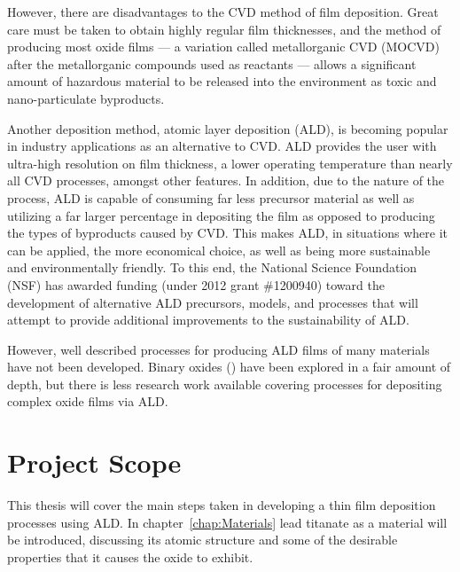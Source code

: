 However, there are disadvantages to the CVD method of film deposition. Great care must be taken to obtain highly regular film thicknesses, and the method of producing most oxide films --- a variation called metallorganic CVD (MOCVD) after the metallorganic compounds used as reactants --- allows a significant amount of hazardous material to be released into the environment as toxic and nano-particulate byproducts. 

Another deposition method, atomic layer deposition (ALD), is becoming popular in industry applications as an alternative to CVD. ALD provides the user with ultra-high resolution on film thickness, a lower operating temperature than nearly all CVD processes, amongst other features. In addition, due to the nature of the process, ALD is capable of consuming far less precursor material as well as utilizing a far larger percentage in depositing the film as opposed to producing the types of byproducts caused by CVD.\cite{ALD-Handbook} This makes ALD, in situations where it can be applied, the more economical choice, as well as being more sustainable and environmentally friendly. To this end, the National Science Foundation (NSF) has awarded funding (under 2012 grant \#1200940) toward the development of alternative ALD precursors, models, and processes that will attempt to provide additional improvements to the sustainability of ALD.

However, well described processes for producing ALD films of many materials have not been developed. Binary oxides () have been explored in a fair amount of depth,\cite{chen_atomic_2007,de_ridder_growth_2002,knez_atomic_2006,lee_al2o3_2003,scheffe_atomic_2009} but there is less research work available covering processes for depositing complex oxide films via ALD. 


\section{Project Scope}
\label{sec:Intro-Scope}

This thesis will cover the main steps taken in developing a thin film deposition processes using ALD. In chapter~\ref{chap:Materials} lead titanate as a material will be introduced, discussing its atomic structure and some of the desirable properties that it causes the oxide to exhibit. 

